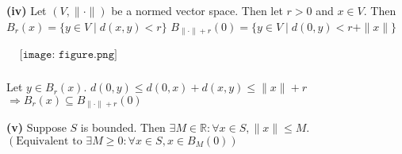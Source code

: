 \documentclass{article}
\theoremstyle{definition}
\numberwithin{equation}{section}
\begin{document}
\noindent\textbf{(iv)} Let $(V, \| \cdot \|)$ be a normed vector space. Then let $r > 0$ and $x \in V$. Then
$
B_r(x) = \{ y \in V \mid d(x, y) < r \}
$
$
B_{\|\cdot\|+r}(0) = \{ y \in V \mid d(0, y) < r + \| x \| \}
$

$
\begin{aligned}
    &\texttt{[image: figure.png]} \\
\end{aligned}
$

Let $y \in B_r(x)$. 
$
d(0, y) \leq d(0, x) + d(x, y) \leq \| x \| + r
$
$
\Rightarrow B_r(x) \subseteq B_{\|\cdot\|+r}(0)
$

\noindent\textbf{(v)} Suppose $S$ is bounded. Then $\exists M \in \mathbb{R}: \forall x \in S, \| x \| \leq M$.
$
\left( \text{Equivalent to } \exists M \geq 0: \forall x \in S, x \in B_M(0) \right)
$
\end{document}
